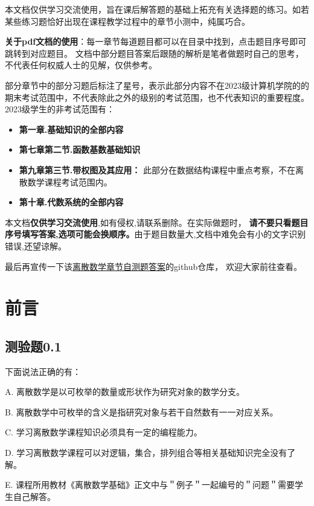 \documentclass[UTF8, heading=true]{ctexart}
\begin{document}
本文档仅供学习交流使用，旨在课后解答题的基础上拓充有关选择题的练习。如若某些练习题恰好出现在课程教学过程中的章节小测中，纯属巧合。

\textbf{关于pdf文档的使用}：每一章节每道题目都可以在目录中找到，点击题目序号即可跳转到对应题目。
文档中部分题目答案后跟随的解析是笔者做题时自己的思考，不代表任何权威人士的见解，仅供参考。

部分章节中的部分习题后标注了星号，表示此部分内容不在2023级计算机学院的的期末考试范围中，不代表除此之外的级别的考试范围，也不代表知识的重要程度。
2023级学生的非考试范围有：
\begin{itemize}
  \item \textbf{第一章.基础知识的全部内容}
  \item \textbf{第七章第二节.函数基数基础知识}
  \item \textbf{第九章第三节.带权图及其应用：} 此部分在数据结构课程中重点考察，不在离散数学课程考试范围内。
  \item \textbf{第十章.代数系统的全部内容}
\end{itemize}

本文档\textbf{仅供学习交流使用},如有侵权,请联系删除。在实际做题时，
\textbf{请不要只看题目序号填写答案,选项可能会换顺序。}由于题目数量大,文档中难免会有小的文字识别错误,还望谅解。

最后再宣传一下该\href{https://github.com/BlackMaple1203/SYSU-Discrete-Mathematics-Exam-Answers}{离散数学章节自测题答案}的github仓库，
欢迎大家前往查看。


\clearpage

{}


\section*{前言}

\subsection{测验题0.1}

下面说法正确的有：

A. 离散数学是以可枚举的数量或形状作为研究对象的数学分支。

B. 离散数学中可枚举的含义是指研究对象与若干自然数有一一对应关系。

C. 学习离散数学课程知识必须具有一定的编程能力。

D. 学习离散数学课程可以对逻辑，集合，排列组合等相关基础知识完全没有了解。

E. 课程所用教材《离散数学基础》正文中与＂例子＂一起编号的＂问题＂需要学生自己解答。
\end{document}
